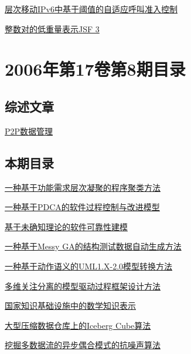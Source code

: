 \documentclass[a4paper]{article}
\begin{document}
\href{http://www.jos.org.cn/ch/reader/download_pdf.aspx?file_no=20060918&year_id=2006&quarter_id=9&falg=1}{层次移动IPv6中基于阈值的自适应呼叫准入控制}

\href{http://www.jos.org.cn/ch/reader/download_pdf.aspx?file_no=20060919&year_id=2006&quarter_id=9&falg=1}{整数对的低重量表示JSF 3}


\section{\textbf{2006年第17卷第8期目录}}
\subsection{综述文章}
\href{http://www.jos.org.cn/ch/reader/download_pdf.aspx?file_no=20060807&year_id=2006&quarter_id=8&falg=1}{P2P数据管理}

\subsection{本期目录}
\href{http://www.jos.org.cn/ch/reader/download_pdf.aspx?file_no=20060801&year_id=2006&quarter_id=8&falg=1}{一种基于功能需求层次凝聚的程序聚类方法}

\href{http://www.jos.org.cn/ch/reader/download_pdf.aspx?file_no=20060802&year_id=2006&quarter_id=8&falg=1}{一种基于PDCA的软件过程控制与改进模型}

\href{http://www.jos.org.cn/ch/reader/download_pdf.aspx?file_no=20060803&year_id=2006&quarter_id=8&falg=1}{基于未确知理论的软件可靠性建模}

\href{http://www.jos.org.cn/ch/reader/download_pdf.aspx?file_no=20060804&year_id=2006&quarter_id=8&falg=1}{一种基于Messy GA的结构测试数据自动生成方法}

\href{http://www.jos.org.cn/ch/reader/download_pdf.aspx?file_no=20060805&year_id=2006&quarter_id=8&falg=1}{一种基于动作语义的UML1.X-2.0模型转换方法}

\href{http://www.jos.org.cn/ch/reader/download_pdf.aspx?file_no=20060806&year_id=2006&quarter_id=8&falg=1}{多维关注分离的模型驱动过程框架设计方法}

\href{http://www.jos.org.cn/ch/reader/download_pdf.aspx?file_no=20060808&year_id=2006&quarter_id=8&falg=1}{国家知识基础设施中的数学知识表示}

\href{http://www.jos.org.cn/ch/reader/download_pdf.aspx?file_no=20060809&year_id=2006&quarter_id=8&falg=1}{大型压缩数据仓库上的Iceberg Cube算法}

\href{http://www.jos.org.cn/ch/reader/download_pdf.aspx?file_no=20060810&year_id=2006&quarter_id=8&falg=1}{挖掘多数据流的异步偶合模式的抗噪声算法}
\end{document}
